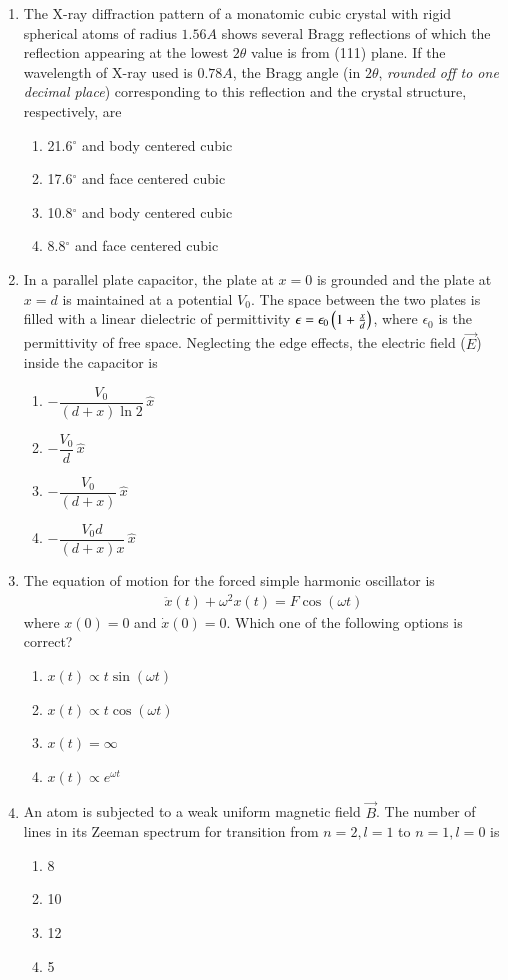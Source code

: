 \documentclass[journal,12pt,onecolumn]{IEEEtran}
\theoremstyle{remark}
\begin{document}
\begin{enumerate}
\item The X-ray diffraction pattern of a monatomic cubic crystal with rigid spherical atoms of radius $1.56A$ shows several Bragg reflections of which the reflection appearing at the lowest $2\theta$ value is from (111) plane. If the wavelength of X-ray used is $0.78A$, the Bragg angle (in $2\theta$, \textit{rounded off to one decimal place}) corresponding to this reflection and the crystal structure, respectively, are
\begin{enumerate}
    \item 21.6$^\circ$ and body centered cubic
    \item 17.6$^\circ$ and face centered cubic
    \item 10.8$^\circ$ and body centered cubic
    \item 8.8$^\circ$ and face centered cubic
\end{enumerate}

\item In a parallel plate capacitor, the plate at $x=0$ is grounded and the plate at $x=d$ is maintained at a potential $V_0$. The space between the two plates is filled with a linear dielectric of permittivity $\epsilon = \epsilon_0\left(1 + \frac{x}{d}\right)$, where $\epsilon_0$ is the permittivity of free space. Neglecting the edge effects, the electric field ($\vec{E}$) inside the capacitor is
\begin{enumerate}
    \item $-\dfrac{V_0}{(d + x)\ln 2}\,\hat{x}$
    \item $-\dfrac{V_0}{d}\,\hat{x}$
    \item $-\dfrac{V_0}{(d + x)}\,\hat{x}$
    \item $-\dfrac{V_0 d}{(d + x)x}\,\hat{x}$
\end{enumerate}

\item The equation of motion for the forced simple harmonic oscillator is
\begin{align*}
    \ddot{x}(t) + \omega^2 x(t) = F \cos(\omega t)
\end{align*}
where $x(0) = 0$ and $\dot{x}(0) = 0$. Which one of the following options is correct?
\begin{enumerate}
    \item $x(t) \propto t\sin(\omega t)$
    \item $x(t) \propto t\cos(\omega t)$
    \item $x(t) = \infty$
    \item $x(t) \propto e^{\omega t}$
\end{enumerate}
\item An atom is subjected to a weak uniform magnetic field $\vec{B}$. The number of lines in its Zeeman spectrum for transition from $n = 2, l = 1$ to $n = 1, l = 0$ is
\begin{enumerate}
    \item 8
    \item 10
    \item 12
    \item 5
\end{enumerate}


\end{enumerate}
\end{document}
